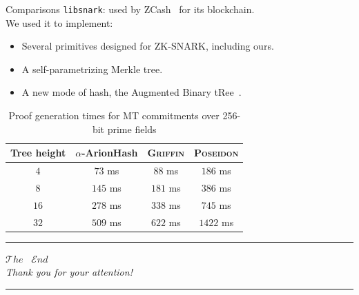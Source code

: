 \documentclass{beamer}
\newcommand{\Poseidon}{\textnormal{\textsc{Poseidon}}}
\newcommand{\Griffin}{\textnormal{\textsc{Griffin}}}
\newcommand{\Arionhash}{\textnormal{\textsf{ArionHash}}}
\newcommand{\Aarionhash}{\textnormal{\(\alpha \)-\Arionhash}}
\begin{document}
\begin{frame}{Comparisons}
  \texttt{libsnark}: used by ZCash~\cite{SassonCGGMTV2014} for its blockchain.\\
  We used it to implement:
  \begin{itemize}
    \item Several primitives designed for ZK-SNARK, including ours.
    \item A self-parametrizing Merkle tree.
    \item A new mode of hash, the Augmented Binary tRee~\cite{AndreevaBR2021}.
  \end{itemize}
  \begin{table}
    \caption*{Proof generation times for MT commitments over 256-bit prime fields}
    \centering
        \begin{tabular}{c c c c}  
          \toprule
          Tree height & \Aarionhash{} & \Griffin{} & \Poseidon{} \\
          \midrule
          \(4\)   & \(73\) ms  & \(88\) ms & \(186\) ms  \\
          \(8\)   & \(145\) ms & \(181\) ms & \(386\) ms  \\
          \(16\)  & \(278\) ms & \(338\) ms & \(745\) ms  \\
          \(32\)  & \(509\) ms & \(622\) ms & \(1422\) ms \\
          \bottomrule
        \end{tabular}
  \end{table}
\end{frame}


\begin{frame}
  \begin{center}
    \rule{\textwidth}{0.5pt}
    \huge{\(\mathcal{T}\mathit{he}\)} \ \huge{\(\mathcal{E}\mathit{nd}\)}\\
    \Large{\emph{Thank you for your attention!}}
    \rule{\textwidth}{0.5pt}
  \end{center}
\end{frame}

\begin{frame}[allowframebreaks]  
  
  
\end{frame}
\end{document}
